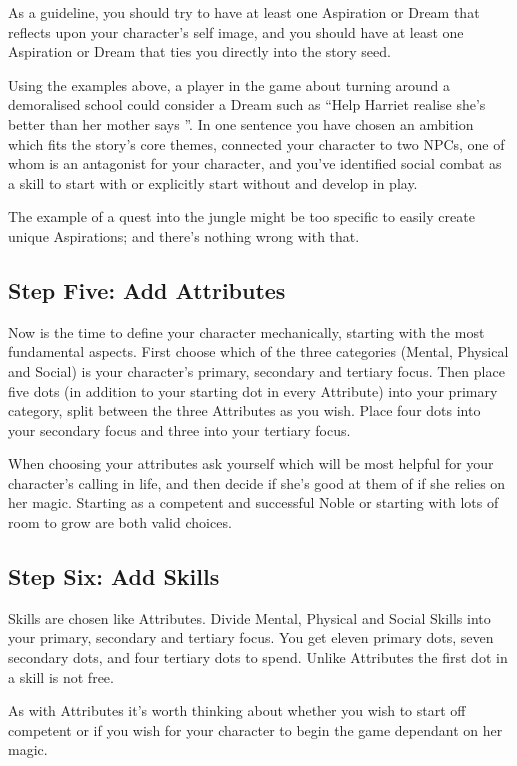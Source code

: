 As a guideline, you should try to have at least one Aspiration or Dream that reflects upon your character's self image, and you should have at least one Aspiration or Dream that ties you directly into the story seed. 

Using the examples above, a player in the game about turning around a demoralised school could consider a Dream such as \textquotedblleft Help Harriet realise she's better than her mother says \textquotedblright. In one sentence you have chosen an ambition which fits the story's core themes, connected your character to two NPCs, one of whom is an antagonist for your character, and you've identified social combat as a skill to start with or explicitly start without and develop in play. 

The example of a quest into the jungle might be too specific to easily create unique Aspirations; and there's nothing wrong with that. 

\subsection*{Step Five: Add Attributes}

Now is the time to define your character mechanically, starting with the most fundamental aspects. First choose which of the three categories (Mental, Physical and Social) is your character's primary, secondary and tertiary focus. Then place five dots (in addition to your starting dot in every Attribute) into your primary category, split between the three Attributes as you wish. Place four dots into your secondary focus and three into your tertiary focus. 

When choosing your attributes ask yourself which will be most helpful for your character's calling in life, and then decide if she's good at them of if she relies on her magic. Starting as a competent and successful Noble or starting with lots of room to grow are both valid choices. 

\subsection*{Step Six: Add Skills}

Skills are chosen like Attributes. Divide Mental, Physical and Social Skills into your primary, secondary and tertiary focus. You get eleven primary dots, seven secondary dots, and four tertiary dots to spend. Unlike Attributes the first dot in a skill is not free. 

As with Attributes it's worth thinking about whether you wish to start off competent or if you wish for your character to begin the game dependant on her magic. 


